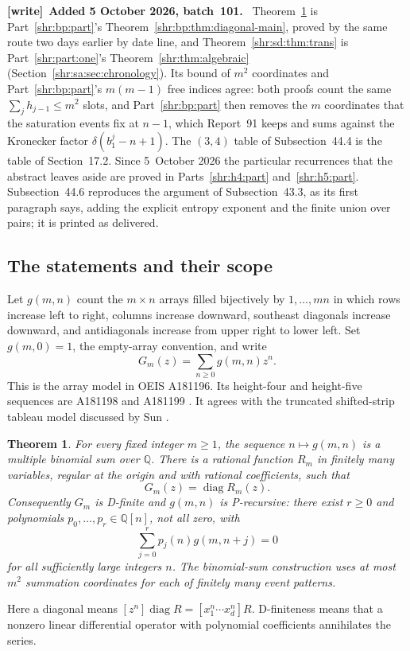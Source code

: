 \documentclass[11pt,letterpaper]{article}
\numberwithin{equation}{section}
\newtheorem{theorem}{Theorem}[section]
\theoremstyle{definition}
\newcommand{\Q}{\mathbb Q}
\newcommand{\1}{\mathbf 1}
\newcommand{\diag}{\operatorname{diag}}
\newcommand{\del}{\delta}
\newenvironment{writenote}[1][]{\par\smallskip\begingroup\small
 \noindent\textbf{[write]}\if\relax\detokenize{#1}\relax\else~\textbf{#1.}\fi\ }%
 {\par\endgroup\smallskip}
\begin{document}
\begin{writenote}[Added 5 October 2026, batch~101]
Theorem~\ref{shr:sd:thm:diagonal} is Part~\ref{shr:bp:part}'s
Theorem~\ref{shr:bp:thm:diagonal-main}, proved by the same route two days
earlier by date line, and Theorem~\ref{shr:sd:thm:trans} is
Part~\ref{shr:part:one}'s Theorem~\ref{shr:thm:algebraic}
(Section~\ref{shr:sa:sec:chronology}). Its bound of $m^2$ coordinates and
Part~\ref{shr:bp:part}'s $m(m-1)$ free indices agree: both proofs count the
same $\sum_jh_{j-1}\le m^2$ slots, and Part~\ref{shr:bp:part} then removes
the $m$ coordinates that the saturation events fix at $n-1$, which
Report~91 keeps and sums against the Kronecker factor $\del(b^j_1-n+1)$.
The $(3,4)$ table of Subsection~44.4 is the table of Section~17.2. Since
5~October 2026 the particular recurrences that the abstract leaves aside
are proved in Parts~\ref{shr:h4:part} and~\ref{shr:h5:part}.
Subsection~44.6 reproduces the argument of Subsection~43.3, as its first
paragraph says, adding the explicit entropy exponent and the finite union
over pairs; it is printed as delivered.
\end{writenote}

\subsection{The statements and their scope}
Let $g(m,n)$ count the $m\times n$ arrays filled bijectively by $1,\ldots,mn$ in which rows increase left to right, columns increase downward, southeast diagonals increase downward, and antidiagonals increase from upper right to lower left. Set $g(m,0)=1$, the empty-array convention, and write
\[
 G_m(z)=\sum_{n\ge0}g(m,n)z^n.
\]
This is the array model in OEIS A181196. Its height-four and height-five sequences are A181198 and A181199 \cite{oeis196,oeis198,oeis199}. It agrees with the truncated shifted-strip tableau model discussed by Sun \cite{Sun}.

\begin{theorem}\label{shr:sd:thm:diagonal}
For every fixed integer $m\ge1$, the sequence $n\mapsto g(m,n)$ is a multiple binomial sum over $\Q$. There is a rational function $R_m$ in finitely many variables, regular at the origin and with rational coefficients, such that
\[
 G_m(z)=\diag R_m(z).
\]
Consequently $G_m$ is D-finite and $g(m,n)$ is P-recursive: there exist $r\ge0$ and polynomials $p_0,\ldots,p_r\in\Q[n]$, not all zero, with
\[
 \sum_{j=0}^r p_j(n)g(m,n+j)=0
\]
for all sufficiently large integers $n$. The binomial-sum construction uses at most $m^2$ summation coordinates for each of finitely many event patterns.
\end{theorem}
Here a diagonal means $[z^n]\diag R=[x_1^n\cdots x_d^n]R$. D-finiteness means that a nonzero linear differential operator with polynomial coefficients annihilates the series.
\end{document}
